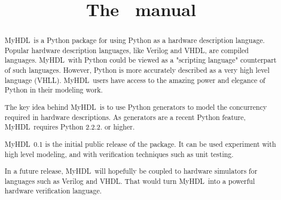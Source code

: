 \documentclass{manual}
\title{The \myhdl\ manual}
\newcommand{\myhdl}{{MyHDL}}
\begin{document}
\maketitle



\begin{abstract}

\noindent

\myhdl\ is a Python package for using Python as a hardware description
language. Popular hardware description languages, like Verilog and
VHDL, are compiled languages. \myhdl\ with Python could be viewed as a
"scripting language" counterpart of such languages. However, Python is
more accurately described as a very high level language
(VHLL). \myhdl\ users have access to the amazing power and elegance of
Python in their modeling work.

The key idea behind \myhdl\ is to use Python generators to model the
concurrency required in hardware descriptions. As generators are a
recent Python feature, \myhdl\ requires Python 2.2.2. or higher.

\myhdl\ 0.1 is the initial public release of the package. It can be
used experiment with high level modeling, and with verification
techniques such as unit testing. 

In a future release, \myhdl\ will
hopefully be coupled to hardware simulators for languages such as
Verilog and VHDL. That would turn \myhdl\ into a powerful hardware
verification language.



\end{abstract}

\tableofcontents






\end{document}
